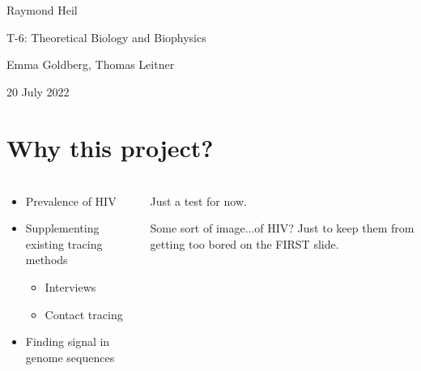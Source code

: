 \documentclass[aspectratio=169]{beamer}
\begin{document}
\begin{frame}

    \begin{center}

        \vfill

        Raymond Heil

        T-6: Theoretical Biology and Biophysics

        Emma Goldberg, Thomas Leitner

        \vfill

        \scriptsize{20 July 2022}

    \end{center}


\end{frame}

\section{Why this project?}

\begin{frame} \frametitle{\insertsection}

    \begin{columns}

        \begin{column}{0.5\textwidth}

            \begin{itemize}
                \item Prevalence of HIV
                \item Supplementing existing tracing methods
                \begin{itemize}
                    \item Interviews
                    \item Contact tracing
                \end{itemize}
                \item Finding signal in genome sequences 
            \end{itemize}

        \end{column}

        \begin{column}{0.5\textwidth}

            Just a test for now.

            Some sort of image...of HIV? Just to keep them from
            getting too bored on the FIRST slide.

        \end{column}

    \end{columns}

\end{frame}
\end{document}
